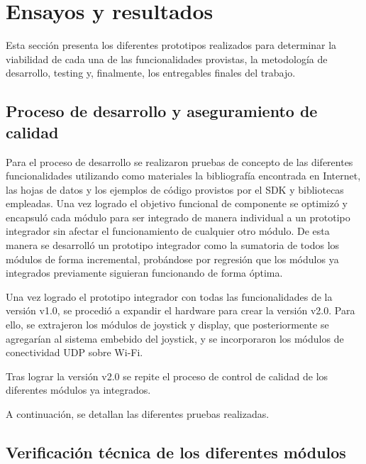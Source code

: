 
\chapter{Ensayos y resultados} %

\label{Chapter4} %

Esta sección presenta los diferentes prototipos realizados para determinar la viabilidad de cada una de las funcionalidades provistas, la metodología de desarrollo, testing y, finalmente, los entregables finales del trabajo.

\section{Proceso de desarrollo y aseguramiento de calidad}
\label{sec:pruebasHW}

Para el proceso de desarrollo se realizaron pruebas de concepto de las diferentes funcionalidades utilizando como materiales la bibliografía encontrada en Internet, las hojas de datos y los ejemplos de código provistos por el SDK y bibliotecas empleadas. Una vez logrado el objetivo funcional de componente se optimizó y encapsuló cada módulo para ser integrado de manera individual a un prototipo integrador sin afectar el funcionamiento de cualquier otro módulo.
De esta manera se desarrolló un prototipo integrador como la sumatoria de todos los módulos de forma incremental, probándose por regresión que los módulos ya integrados previamente siguieran funcionando de forma óptima.

Una vez logrado el prototipo integrador con todas las funcionalidades de la versión v1.0, se procedió a expandir el hardware para crear la versión v2.0. Para ello, se extrajeron los módulos de joystick y display, que posteriormente se agregarían al sistema embebido del joystick, y se incorporaron los módulos de conectividad UDP sobre Wi-Fi.

Tras lograr la versión v2.0 se repite el proceso de control de calidad de los diferentes módulos ya integrados.

A continuación, se detallan las diferentes pruebas realizadas.

\section{Verificación técnica de los diferentes módulos}



